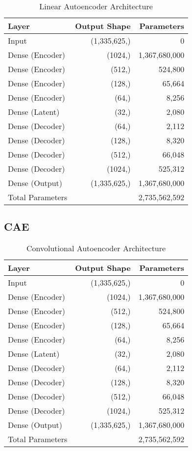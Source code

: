\begin{table}[h]
    \centering
    \begin{tabular}{lrr}
        \toprule
        Layer & Output Shape & Parameters \\
        \midrule
        Input & (1,335,625,) & 0 \\
        Dense (Encoder) & (1024,) & 1,367,680,000 \\
        Dense (Encoder) & (512,) & 524,800 \\
        Dense (Encoder) & (128,) & 65,664 \\
        Dense (Encoder) & (64,) & 8,256 \\
        Dense (Latent) & (32,) & 2,080 \\
        Dense (Decoder) & (64,) & 2,112 \\
        Dense (Decoder) & (128,) & 8,320 \\
        Dense (Decoder) & (512,) & 66,048 \\
        Dense (Decoder) & (1024,) & 525,312 \\
        Dense (Output) & (1,335,625,) & 1,367,680,000 \\
        \midrule
        Total Parameters & & 2,735,562,592 \\
        \bottomrule
    \end{tabular}
    \caption{Linear Autoencoder Architecture}
    \label{tab:a-ae}
\end{table}

\subsection{CAE}
\label{app:a-cae}

\begin{table}[h]
    \centering
    \begin{tabular}{lrr}
        \toprule
        Layer & Output Shape & Parameters \\
        \midrule
        Input & (1,335,625,) & 0 \\
        Dense (Encoder) & (1024,) & 1,367,680,000 \\
        Dense (Encoder) & (512,) & 524,800 \\
        Dense (Encoder) & (128,) & 65,664 \\
        Dense (Encoder) & (64,) & 8,256 \\
        Dense (Latent) & (32,) & 2,080 \\
        Dense (Decoder) & (64,) & 2,112 \\
        Dense (Decoder) & (128,) & 8,320 \\
        Dense (Decoder) & (512,) & 66,048 \\
        Dense (Decoder) & (1024,) & 525,312 \\
        Dense (Output) & (1,335,625,) & 1,367,680,000 \\
        \midrule
        Total Parameters & & 2,735,562,592 \\
        \bottomrule
    \end{tabular}
    \caption{Convolutional Autoencoder Architecture}
    \label{tab:a-cae}
\end{table}

